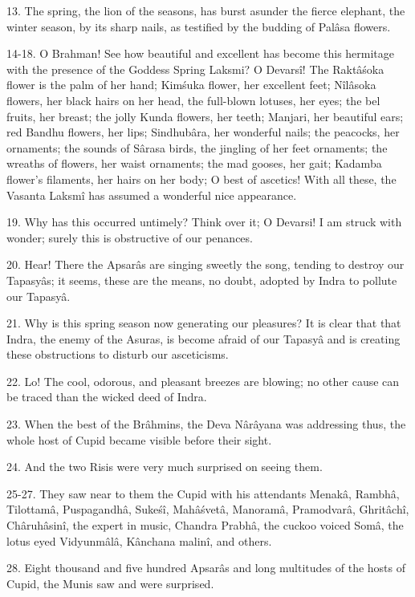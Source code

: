 13. The spring, the lion of the seasons, has burst asunder the fierce elephant, the winter season, by its sharp nails, as testified by the budding of Pal\^asa flowers.

14-18. O Brahman! See how beautiful and excellent has become this hermitage with the presence of the Goddess Spring Laksmi? O Devars\^i! The Rakt\^a\'soka flower is the palm of her hand; Kim\'suka flower, her excellent feet; N\^il\^asoka flowers, her black hairs on her head, the full-blown lotuses, her eyes; the bel fruits, her breast; the jolly Kunda flowers, her teeth; Manjari, her beautiful ears; red Bandhu flowers, her lips; Sindhub\^ara, her wonderful nails; the peacocks, her ornaments; the sounds of S\^arasa birds, the jingling of her feet ornaments; the wreaths of flowers, her waist ornaments; the mad gooses, her gait; Kadamba flower's filaments, her hairs on her body; O best of ascetics! With all these, the Vasanta Laksm\^i has assumed a wonderful nice appearance.

19. Why has this occurred untimely? Think over it; O Devarsi! I am struck with wonder; surely this is obstructive of our penances.

20. Hear! There the Apsar\^as are singing sweetly the song, tending to destroy our Tapasy\^as; it seems, these are the means, no doubt, adopted by Indra to pollute our Tapasy\^a.

21. Why is this spring season now generating our pleasures? It is clear that that Indra, the enemy of the Asuras, is become afraid of our Tapasy\^a and is creating these obstructions to disturb our asceticisms.

22. Lo! The cool, odorous, and pleasant breezes are blowing; no other cause can be traced than the wicked deed of Indra.

23. When the best of the Br\^ahmins, the Deva N\^ar\^ayana was addressing thus, the whole host of Cupid became visible before their sight.

24. And the two Risis were very much surprised on seeing them.

25-27. They saw near to them the Cupid with his attendants Menak\^a, Rambh\^a, Tilottam\^a, Puspagandh\^a, Suke\'s\^i, Mah\^a\'svet\^a, Manoram\^a, Pramodvar\^a, Ghrit\^ach\^i, Ch\^aruh\^asin\^i, the expert in music, Chandra Prabh\^a, the cuckoo voiced Som\^a, the lotus eyed Vidyunm\^al\^a, K\^anchana malin\^i, and others.

28. Eight thousand and five hundred Apsar\^as and long multitudes of the hosts of Cupid, the Munis saw and were surprised.

